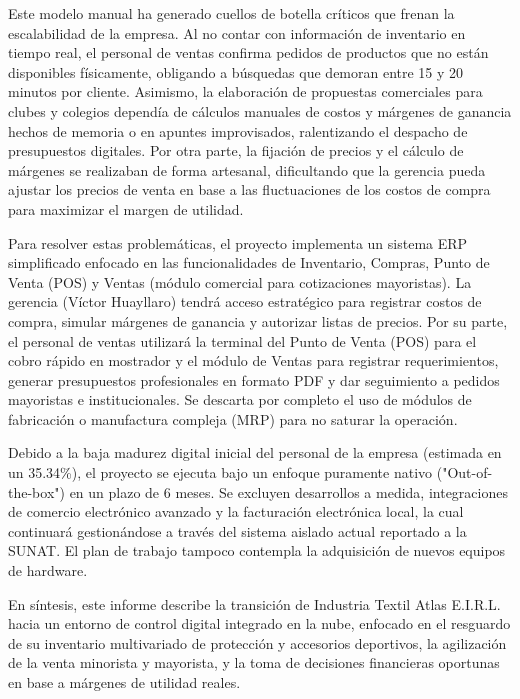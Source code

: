 Este modelo manual ha generado cuellos de botella críticos que frenan la escalabilidad de la empresa. Al no contar con información de inventario en tiempo real, el personal de ventas confirma pedidos de productos que no están disponibles físicamente, obligando a búsquedas que demoran entre 15 y 20 minutos por cliente. Asimismo, la elaboración de propuestas comerciales para clubes y colegios dependía de cálculos manuales de costos y márgenes de ganancia hechos de memoria o en apuntes improvisados, ralentizando el despacho de presupuestos digitales. Por otra parte, la fijación de precios y el cálculo de márgenes se realizaban de forma artesanal, dificultando que la gerencia pueda ajustar los precios de venta en base a las fluctuaciones de los costos de compra para maximizar el margen de utilidad.

Para resolver estas problemáticas, el proyecto implementa un sistema ERP simplificado enfocado en las funcionalidades de Inventario, Compras, Punto de Venta (POS) y Ventas (módulo comercial para cotizaciones mayoristas). La gerencia (Víctor Huayllaro) tendrá acceso estratégico para registrar costos de compra, simular márgenes de ganancia y autorizar listas de precios. Por su parte, el personal de ventas utilizará la terminal del Punto de Venta (POS) para el cobro rápido en mostrador y el módulo de Ventas para registrar requerimientos, generar presupuestos profesionales en formato PDF y dar seguimiento a pedidos mayoristas e institucionales. Se descarta por completo el uso de módulos de fabricación o manufactura compleja (MRP) para no saturar la operación.

Debido a la baja madurez digital inicial del personal de la empresa (estimada en un 35.34\%), el proyecto se ejecuta bajo un enfoque puramente nativo ("Out-of-the-box") en un plazo de 6 meses. Se excluyen desarrollos a medida, integraciones de comercio electrónico avanzado y la facturación electrónica local, la cual continuará gestionándose a través del sistema aislado actual reportado a la SUNAT. El plan de trabajo tampoco contempla la adquisición de nuevos equipos de hardware.

En síntesis, este informe describe la transición de Industria Textil Atlas E.I.R.L. hacia un entorno de control digital integrado en la nube, enfocado en el resguardo de su inventario multivariado de protección y accesorios deportivos, la agilización de la venta minorista y mayorista, y la toma de decisiones financieras oportunas en base a márgenes de utilidad reales.
